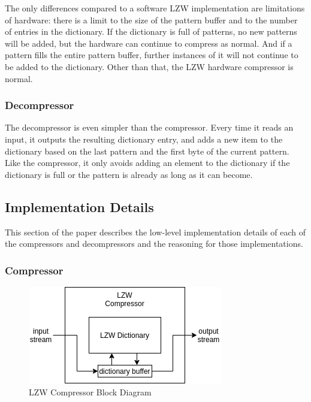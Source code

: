 \documentclass[doublespace,nopageskip]{VTthesis}
\begin{document}
The only differences compared to a software LZW implementation are limitations of hardware: there is a limit to the size of the pattern buffer and to the number of entries in the dictionary. If the dictionary is full of patterns, no new patterns will be added, but the hardware can continue to compress as normal. And if a pattern fills the entire pattern buffer, further instances of it will not continue to be added to the dictionary. Other than that, the LZW hardware compressor is normal.

\subsubsection{Decompressor}\label{sss:lzw_decompressor_design}
The decompressor is even simpler than the compressor. Every time it reads an input, it outputs the resulting dictionary entry, and adds a new item to the dictionary based on the last pattern and the first byte of the current pattern. Like the compressor, it only avoids adding an element to the dictionary if the dictionary is full or the pattern is already as long as it can become.

\subsection{Implementation Details}\label{se:lzw_implementation_details}
This section of the paper describes the low-level implementation details of each of the compressors and decompressors and the reasoning for those implementations.

\subsubsection{Compressor}\label{sss:lzw_compressor_implementation}

\begin{figure}[htb]
	\centering
	\includegraphics[scale=1]{LZW Compressor.png}
	\caption{LZW Compressor Block Diagram}
	\label{fig:lzw_compressor_block_diagram}
\end{figure}
\end{document}
